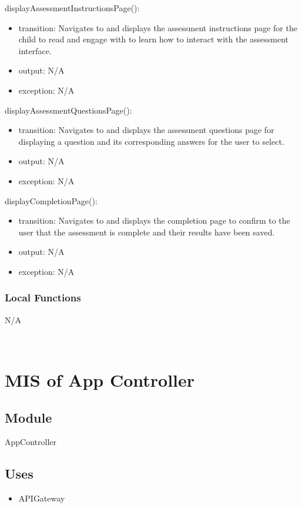 \documentclass[12pt, titlepage]{article}
\begin{document}
\noindent displayAssessmentInstructionsPage():
\begin{itemize}
\item transition: Navigates to and displays the assessment instructions page for the child to read and engage with to learn how to interact with the assessment interface.
\item output: N/A
\item exception: N/A
\end{itemize}

\noindent displayAssessmentQuestionsPage():
\begin{itemize}
\item transition: Navigates to and displays the assessment questions page for displaying a question and its corresponding answers for the user to select.
\item output: N/A
\item exception: N/A
\end{itemize}

\noindent displayCompletionPage():
\begin{itemize}
\item transition: Navigates to and displays the completion page to confirm to the user that the assessment is complete and their results have been saved.
\item output: N/A
\item exception: N/A
\end{itemize}

\subsubsection{Local Functions}
N/A

~\newpage
\section{MIS of App Controller \label{mAppController} }

\subsection{Module}

AppController

\subsection{Uses}

\begin{itemize}
  \item APIGateway
\end{itemize}
\end{document}
